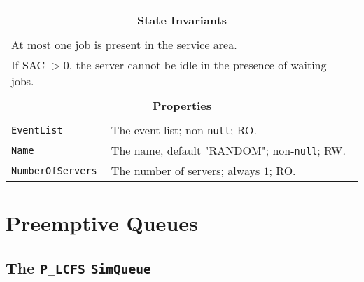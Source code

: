 \documentclass[12pt]{book}
\begin{document}
\begin{tabular}{|l|l|l|}
\hline
\multicolumn{3}{|c|}{} \\
\multicolumn{3}{|c|}{\bf State  Invariants} \\
\multicolumn{3}{|c|}{} \\
\hline
\multicolumn{3}{|l|}{At most one job is present in the service area.} \\
\multicolumn{3}{|l|}{If SAC $> 0$, the server cannot be idle in the presence of waiting jobs.} \\
\hline
\multicolumn{3}{|c|}{} \\
\multicolumn{3}{|c|}{\bf Properties} \\
\multicolumn{3}{|c|}{} \\
\hline
\lstinline|EventList|       & \multicolumn{2}{|l|}{The event list; non-\lstinline|null|; RO.} \\
\hline
\lstinline|Name|            & \multicolumn{2}{|l|}{The name, default "RANDOM"; non-\lstinline|null|; RW.} \\
\hline
\lstinline|NumberOfServers| & \multicolumn{2}{|l|}{The number of servers; always $1$; RO.} \\
\hline
\end{tabular}

\section{Preemptive Queues}

\subsection{The \lstinline{P_LCFS} \lstinline{SimQueue}}
\end{document}
